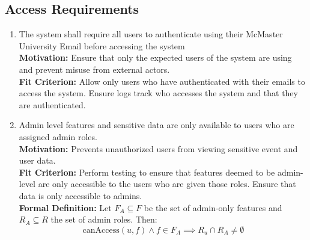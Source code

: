 \documentclass[12pt]{article}
\begin{document}
\subsection{Access Requirements}
\begin{enumerate}[align=left,
  leftmargin=*,
  labelsep=1em,
  itemindent=0em,
  label=\bfseries AC-\arabic*:,
  ref=\bfseries AC-\arabic*]
  \item \label{SAR1} The system shall require all users to authenticate using their McMaster University Email before accessing the system \\[2mm]
    {\bf Motivation:} Ensure that only the expected users of the system are using and prevent misuse from external actors.  \\
    {\bf Fit Criterion:} Allow only users who have authenticated with their emails to access the system. Ensure logs track who accesses the system and that they are authenticated.\\

  \item \label{SAR2} Admin level features and sensitive data are only available to users who are assigned admin roles. \\ [2mm]
    {\bf Motivation:} Prevents unauthorized users from viewing sensitive event and user data.  \\
    {\bf Fit Criterion:} Perform testing to ensure that features deemed to be admin-level are only accessible to the users who are given those roles. Ensure that data is only accessible to admins.\\
    {\bf Formal Definition:} Let $F_A \subseteq F$ be the set of admin-only features and 
      $R_A \subseteq R$ the set of admin roles. Then:
      \[
        \text{canAccess}(u, f) \wedge f \in F_A \implies R_u \cap R_A \neq \emptyset
      \]

  \end{enumerate}
\end{document}
